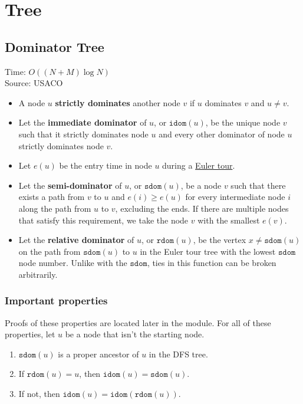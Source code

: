 \chapter{Tree}


\section{Dominator Tree}

Time: $O((N + M) \log N)$\\
Source: USACO\\

\begin{itemize}
    \item A node $u$ \textbf{strictly dominates} another node $v$ if $u$ dominates $v$ and $u \ne v$.
    \item Let the \textbf{immediate dominator} of $u$, or $\texttt{idom}(u)$, be the unique node $v$ such that it strictly dominates node $u$ and every other dominator of node $u$ strictly dominates node $v$.
    \item Let $e(u)$ be the entry time in node $u$ during a \href{/gold/tree-euler}{Euler tour}.
    \item Let the \textbf{semi-dominator} of $u$, or $\texttt{sdom}(u)$, be a node $v$ such that there exists a path from $v$ to $u$ and $e(i) \ge e(u)$ for every intermediate node $i$ along the path from $u$ to $v$, excluding the ends.
    If there are multiple nodes that satisfy this requirement, we take the node $v$ with the smallest $e(v)$.
    \item Let the \textbf{relative dominator} of $u$, or $\texttt{rdom}(u)$, be the vertex $x \ne \texttt{sdom}(u)$ on the path from $\texttt{sdom}(u)$ to $u$ in the Euler tour tree with the lowest $\texttt{sdom}$ node number.
    Unlike with the $\texttt{sdom}$, ties in this function can be broken arbitrarily.
\end{itemize}

\subsection*{Important properties}
Proofs of these properties are located later in the module.  
For all of these properties, let $u$ be a node that isn't the starting node.

\begin{enumerate}
    \item $\texttt{sdom}(u)$ is a proper ancestor of $u$ in the DFS tree.
    \item If $\texttt{rdom}(u)=u$, then $\texttt{idom}(u)=\texttt{sdom}(u)$.
    \item If not, then $\texttt{idom}(u)=\texttt{idom}(\texttt{rdom}(u))$.
\end{enumerate}

